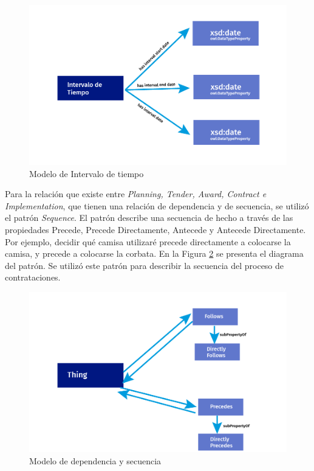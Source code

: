 \begin{figure}[ht!]
    \centering
    \includegraphics[width=150mm]{figuras/Diagramas_Tiempo.png}
    \caption{Modelo de Intervalo de tiempo}
    \label{img:Modelo de Intervalo de precio}
    
\end{figure}

Para la relación que existe entre \textit{Planning, Tender, Award, Contract e Implementation}, que tienen una relación de dependencia y de secuencia, se utilizó el patrón \textit{Sequence}. El patrón describe una secuencia de hecho a través de las propiedades Precede, Precede Directamente, Antecede y Antecede Directamente. Por ejemplo, decidir qué camisa utilizaré precede directamente a colocarse la camisa, y precede a colocarse la corbata. En la Figura \ref{img:Modelo de dependencia y secuencia} se presenta el diagrama del patrón. Se utilizó este patrón para describir la secuencia del proceso de contrataciones.

\begin{figure}[ht!]
    \centering
    \includegraphics[width=150mm]{figuras/Diagramas_Follows.png}
    \caption{Modelo de dependencia y secuencia}
    \label{img:Modelo de dependencia y secuencia}
    
\end{figure}


